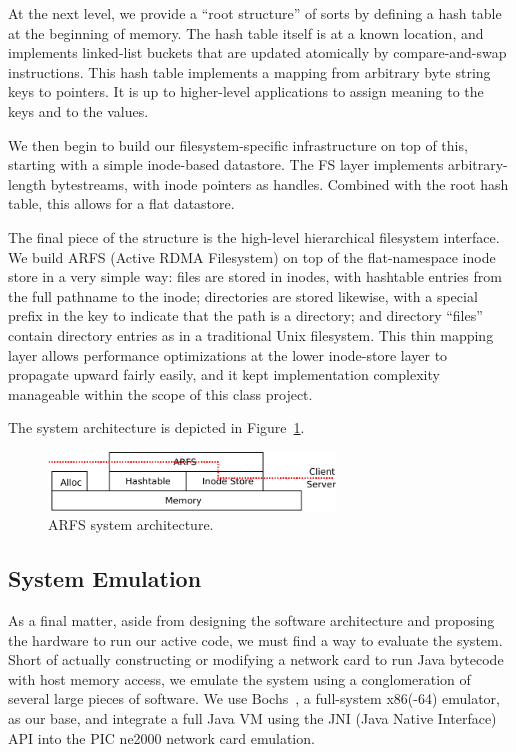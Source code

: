 \documentclass[10pt]{article}
\begin{document}
At the next level, we provide a ``root structure'' of sorts by
defining a hash table at the beginning of memory. The hash table
itself is at a known location, and implements linked-list buckets that
are updated atomically by compare-and-swap instructions. This hash
table implements a mapping from arbitrary byte string keys to
pointers. It is up to higher-level applications to assign meaning to
the keys and to the values.

We then begin to build our filesystem-specific infrastructure on top
of this, starting with a simple inode-based datastore. The FS layer
implements arbitrary-length bytestreams, with inode pointers as
handles. Combined with the root hash table, this allows for a flat
datastore.

The final piece of the structure is the high-level hierarchical
filesystem interface. We build ARFS (Active RDMA Filesystem) on top of
the flat-namespace inode store in a very simple way: files are stored
in inodes, with hashtable entries from the full pathname to the inode;
directories are stored likewise, with a special prefix in the key to
indicate that the path is a directory; and directory ``files'' contain
directory entries as in a traditional Unix filesystem. This thin
mapping layer allows performance optimizations at the lower
inode-store layer to propagate upward fairly easily, and it kept
implementation complexity manageable within the scope of this class
project.

The system architecture is depicted in Figure~\ref{fig:fig3}.

\begin{figure}
\centering
\includegraphics[width=3in]{fig/fig3.pdf}
\caption{ARFS system architecture.}
\label{fig:fig3}
\end{figure}
  
\subsection{System Emulation}

As a final matter, aside from designing the software architecture and
proposing the hardware to run our active code, we must find a way to
evaluate the system. Short of actually constructing or modifying a
network card to run Java bytecode with host memory access, we emulate
the system using a conglomeration of several large pieces of
software. We use Bochs~\cite{bochs}, a full-system x86(-64) emulator,
as our base, and integrate a full Java VM using the JNI (Java Native
Interface) API into the PIC ne2000 network card emulation.
\end{document}
